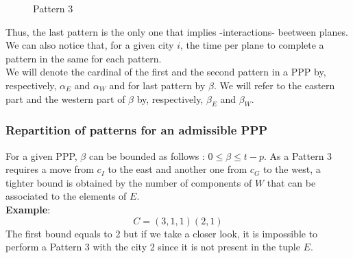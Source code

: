 \documentclass[a4paper,11pt]{article}
\begin{document}
\begin{figure}
\centering
{}
\caption{\label{M3} Pattern 3}
\end{figure}

\noindent
Thus, the last pattern is the only one that implies -interactions- beetween planes.\\

\noindent
We can also notice that, for a given city $i$, the time per plane to complete a pattern in the same for each pattern.\\

\noindent
We will denote the cardinal of the first and the second pattern in a PPP by, respectively, $\alpha_E$ and $\alpha_W$ and for last pattern by $\beta$. We will refer to the eastern part and the western part of $\beta$ by, respectively, $\beta_E$ and $\beta_W$.\\

\subsubsection{Repartition of patterns for an admissible PPP}

For a given PPP, $\beta$ can be bounded as follows : $0 \leq \beta \leq t-p$.
As a Pattern 3 requires a move from $c_I$ to the east and another one from $c_G$ to the west, a tighter bound is obtained by the number of components of $W$ that can be associated to the elements of $E$.\\

{\bf Example}: $$C = (3,1,1)(2,1)$$
The first bound equals to 2 but if we take a closer look, it is impossible to perform a Pattern 3 with the city 2 since it is not present in the tuple $E$.\\
\end{document}
